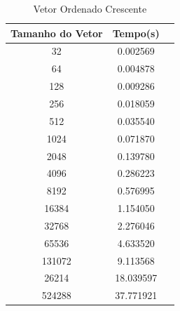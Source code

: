 \documentclass[12pt,a4paper,twoside]{report}
\begin{document}
\begin{table}[h]
  \centering
  \caption{Vetor Ordenado Crescente \label{tab:oc}}
  \begin{tabular}{ccc} \\\hline
  \textbf{Tamanho do Vetor}  & \textbf{Tempo(s)} \\\hline
  32                              & 0.002569          \\\hline
  64                              & 0.004878          \\\hline
  128                             & 0.009286          \\\hline
  256                             & 0.018059          \\\hline
  512                             & 0.035540          \\\hline
  1024                            & 0.071870          \\\hline
  2048                            & 0.139780          \\\hline
  4096                            & 0.286223         \\\hline
  8192                            & 0.576995         \\\hline
  16384                           & 1.154050
  \\\hline
  32768                           & 2.276046         \\\hline
  65536                           & 4.633520         \\\hline
  131072                          & 9.113568         \\\hline
  26214                           & 18.039597         \\\hline
  524288                          & 37.771921        \\\hline
  \end{tabular}
\end{table}
\end{document}
